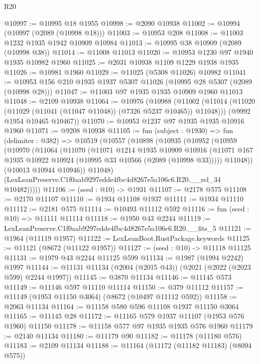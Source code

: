 \begin{lexlean}{R20}
\begin{coremodule}
@10997 := @10995 @18 @1955
@10998 := @2090 @10938
@11002 := @10994 (@10997 (@2089 (@10998 @18)))
@11003 := @10953 @208
@11008 := @11003 @1232 @1935 @1942 @10909 @10984
@11013 := @10995 @38 @10909 (@2089 (@10998 @38))
@11014 := @11008 @11013
@11020 := @10953 @1230 @97 @1940 @1935 @10982 @1960
@11025 := @2031 @10938 @1109 @1229 @1938 @1935
@11026 := @10981 @1960
@11029 := @11025 (@5308 @11026) @10982
@11041 := @10953 @156 @210 @1935 @1937 @5307 @11026 (@10995 @28 @5307 (@2089 (@10998 @28)))
@11047 := @11003 @97 @1935 @1935 @10909 @1960 @11013
@11048 := @2109 @10938
@11064 := @10976
    (@10988
      (@11002 (@11014 (@11020 (@11029 (@11041 (@11047 @11048)) (@7326 @5237 @10465)) @11048)))
      (@9992 @1954 @10465 @10467))
@11070 := @10953 @1237 @97 @1935 @1935 @10916 @1960
@11071 := @9208 @10938
@11105 := fun (subject : @1930) =>
  fun (delimiter : @382) =>
  @10519
    (@10557
      (@10898
        (@10935
          (@10952
            (@10959
              (@10970
                (@11064
                  (@11070
                    (@11071
                      @1214
                      @1935
                      @10909
                      @10916
                      (@11071 @167 @1935 @10922 @10924 (@10995 @33 @10566 (@2089 (@10998 @33)))))
                    @11048))
                (@10013 @10944 @10946))
              @11048)
            (LexLeanPreserve.C1f0aab9297edde4fbc4d8267e5a106c6.R20.__rel_34 @10482)))))
@11106 := (seed : @10) -> @1931
@11107 := @2178 @575
@11108 := @2170 @11107
@11110 := @1934 @11108 @1937
@11111 := @1934 @11110
@11112 := @2181 @575
@11114 := @10493 @11112 @592
@11116 := fun (seed : @10) => @11111 @11114
@11118 := @1950 @43 @2244
@11119 := LexLeanPreserve.C1f0aab9297edde4fbc4d8267e5a106c6.R20.__fits_5
@11121 := @1964 (@11119 @1957)
@11122 := LexLeanBoot.RustPackage.keywords
@11125 := @11121 (@8672 (@11122 @1957))
@11127 := (seed : @10) -> @11118 @11125
@11131 := @1979 @43 @2244 @11125 @599
@11134 := @1987 (@1994 @2242) @1997
@11144 := @11131 @11134 (@2004 (@2015 @43)) (@2021 (@2022 (@2023 @599) @2244 @1997))
@11145 := @3870 @11134
@11146 := @11145 @573
@11149 := @11146 @597 @11110 @11114
@11150 := @379 @11112
@11157 := @11149 (@1953 @11150 @3064) (@8672 (@10497 @11112 @592))
@11158 := @2063 @11134
@11164 := @11158 @580 @596 @11108 @1937 @11150 @3064
@11165 := @11145 @28
@11172 := @11165 @579 @1937 @11107 (@1953 @576 @1960) @11150
@11178 := @11158 @577 @97 @1935 @1935 @576 @1960
@11179 := @2140 @11134
@11180 := @11179 @90
@11182 := @11178 (@11180 @576)
@11183 := @2109 @11134
@11188 := @11164 (@11172 (@11182 @11183) (@8094 @575))

\end{coremodule}
\end{lexlean}
